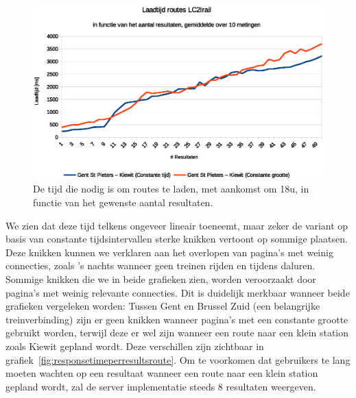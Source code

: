 \begin{figure}[h]
	\centering
	\includegraphics[width=1.00\textwidth]{images/Laadtijd_routes_Gent-St-Pieters_Kiewit.eps}	\caption[Laadtijd van routes tussen Gent en Kiewit in functie van aantal resultaten]{De tijd die nodig is om routes te laden, met aankomst om 18u, in functie van het gewenste aantal resultaten.}
	\label{fig:responsetimeperresultsrouteKiewit}
\end{figure}

We zien dat deze tijd telkens ongeveer lineair toeneemt, maar zeker de variant op basis van constante tijdsintervallen sterke knikken vertoont op sommige plaatsen. Deze knikken kunnen we verklaren aan het overlopen van pagina's met weinig connecties, zoals 's nachts wanneer geen treinen rijden en tijdens daluren. Sommige knikken die we in beide grafieken zien, worden veroorzaakt door pagina's met weinig relevante connecties. Dit is duidelijk merkbaar wanneer beide grafieken vergeleken worden: Tussen Gent en Brussel Zuid (een belangrijke treinverbinding) zijn er geen knikken wanneer pagina's met een constante grootte gebruikt worden, terwijl deze er wel zijn wanneer een route naar een klein station zoals Kiewit gepland wordt. Deze verschillen zijn zichtbaar in grafiek~\ref{fig:responsetimeperresultsroute}. Om te voorkomen dat gebruikers te lang moeten wachten op een resultaat wanneer een route naar een klein station gepland wordt, zal de server implementatie steeds 8 resultaten weergeven.

